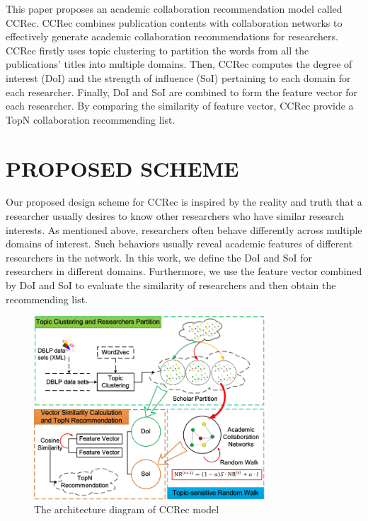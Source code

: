 \documentclass{chi-ext}
\begin{document}
This paper proposes an academic collaboration recommendation model called CCRec. CCRec combines publication contents with collaboration networks to effectively generate academic collaboration recommendations for researchers. CCRec firstly uses topic clustering to partition the words from all the publications' titles into multiple domains. Then, CCRec computes the degree of interest (DoI) and the strength of influence (SoI) pertaining to each domain for each researcher. Finally, DoI and SoI are combined to form the feature vector for each researcher. By comparing the similarity of feature vector, CCRec provide a TopN collaboration recommending list.


\section{PROPOSED SCHEME}
Our proposed design scheme for CCRec is inspired by the reality and truth that a researcher usually desires to know other researchers who have similar research interests. As mentioned above, researchers often behave differently across multiple domains of interest. Such behaviors usually reveal academic features of different researchers in the network. In this work, we define the DoI and SoI for researchers in different domains. Furthermore, we use the feature vector combined by DoI and SoI to evaluate the similarity of researchers and then obtain the recommending list.


\begin{figure}
\centering
\includegraphics [width=3.4in]{Fig1.png}
\caption{The architecture diagram of CCRec model}
\end{figure}
\end{document}
